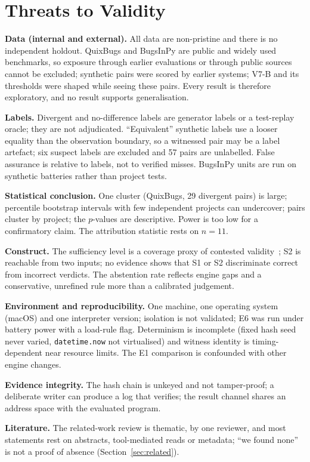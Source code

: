 \section{Threats to Validity}\label{sec:threats}
\textbf{Data (internal and external).} All data are non-pristine and there is no independent holdout. QuixBugs and BugsInPy are public and widely used benchmarks, so exposure through earlier evaluations or through public sources cannot be excluded; synthetic pairs were scored by earlier systems; V7-B and its thresholds were shaped while seeing these pairs. Every result is therefore exploratory, and no result supports generalisation.

\textbf{Labels.} Divergent and no-difference labels are generator labels or a test-replay oracle; they are not adjudicated. ``Equivalent'' synthetic labels use a looser equality than the observation boundary, so a witnessed pair may be a label artefact; six suspect labels are excluded and 57 pairs are unlabelled. False assurance is relative to labels, not to verified misses. BugsInPy units are run on synthetic batteries rather than project tests.

\textbf{Statistical conclusion.} One cluster (QuixBugs, 29 divergent pairs) is large; percentile bootstrap intervals with few independent projects can undercover; pairs cluster by project; the $p$-values are descriptive. Power is too low for a confirmatory claim. The attribution statistic rests on $n=11$.

\textbf{Construct.} The sufficiency level is a coverage proxy of contested validity~\cite{inozemtseva2014coverage,just2014mut}; S2 is reachable from two inputs; no evidence shows that S1 or S2 discriminate correct from incorrect verdicts. The abstention rate reflects engine gaps and a conservative, unrefined rule more than a calibrated judgement.

\textbf{Environment and reproducibility.} One machine, one operating system (macOS) and one interpreter version; isolation is not validated; E6 was run under battery power with a load-rule flag. Determinism is incomplete (fixed hash seed never varied, \texttt{datetime.now} not virtualised) and witness identity is timing-dependent near resource limits. The E1 comparison is confounded with other engine changes.

\textbf{Evidence integrity.} The hash chain is unkeyed and not tamper-proof; a deliberate writer can produce a log that verifies; the result channel shares an address space with the evaluated program.

\textbf{Literature.} The related-work review is thematic, by one reviewer, and most statements rest on abstracts, tool-mediated reads or metadata; ``we found none'' is not a proof of absence (Section~\ref{sec:related}).
